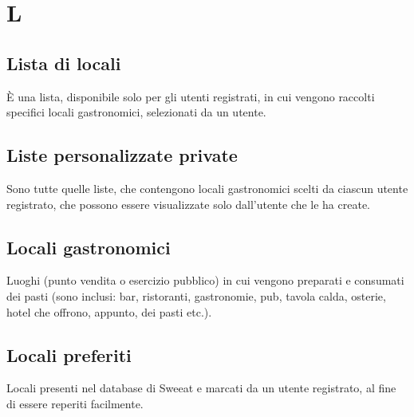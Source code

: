 \section{L}

\subsection{Lista di locali} È una lista, disponibile solo per gli utenti registrati, in cui vengono raccolti specifici locali gastronomici, selezionati da un utente.

\subsection{Liste personalizzate private} Sono tutte quelle liste, che contengono locali gastronomici scelti da ciascun utente registrato, che possono essere visualizzate solo dall’utente che le ha create.

\subsection{Locali gastronomici} Luoghi (punto vendita o esercizio pubblico) in cui vengono preparati e consumati dei pasti (sono inclusi: bar, ristoranti, gastronomie, pub, tavola calda, osterie, hotel che offrono, appunto, dei pasti etc.).

\subsection{Locali preferiti} Locali presenti nel database di Sweeat e marcati da un utente registrato, al fine di essere reperiti facilmente.

\clearpage